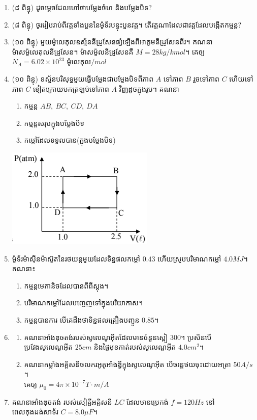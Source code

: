 \documentclass{officialexam}
\begin{document}
\begin{enumerate}[m]
	\item (៨ ពិន្ទុ) ដូចម្តេចដែលហៅថាបម្លែងចំហ និងបម្លែងបិទ?
	\item (៨ ពិន្ទុ) ចូររៀបរាប់ពីវគ្គទាំងបួននៃម៉ូទ័របន្ទុះបួនវគ្គ។ តើវគ្គណាដែលជាវគ្គដែលបង្កើតកម្មន្ត?
	\item (១០ ពិន្ទុ) មួយម៉ូលេគុលឧស្ម័ននីដ្រូសែនផ្សំឡើងពីអាតូមនីដ្រូសែនពីរ។ គណនាម៉ាសម៉ូលេគុលនីដ្រូសែន។ ម៉ាសម៉ូលនីដ្រូសែនគឺ $M=28kg/kmol$។ គេឲ្យ $N_A=6.02\times10^{23}$ ម៉ូលេគុល$/mol$
	\item (១០ ពិន្ទុ) ឧស្ម័នបរិសុទ្ធមួយធ្វើបម្លែងជាបម្លែងបិទពីភាព $A$ ទៅភាព $B$ រួចទៅភាព $C$ ហើយទៅភាព $C$ ទៀតក្រោយមកត្រឡប់ទៅភាព $A$ វិញដូចក្នុងរូប។ គណនា
	\begin{multicols}{2}
		\begin{enumerate}[k]
			\item កម្មន្ត $AB,~BC,~CD,~DA$
			\item កម្មន្តសរុបក្នុងបម្លែងបិទ
			\item កម្តៅដែលទទួលបាន(ក្នុងបម្លែងបិទ)
		\end{enumerate}
		\includegraphics[scale=0.6]{image1}
	\end{multicols}
	\item ម៉ូទ័រម៉ាសុីនម៉ាស៊ូតនៃរថយន្តមួយដែលទិន្នផលកម្តៅ $0.43$ ហើយស្រូបបរិមាណកម្តៅ $4.0MJ$។ គណនា៖
	\begin{enumerate}[k]
		\item កម្មន្តមេកានិចដែលបានពីពីស្តុង។
		\item បរិមាណកម្តៅដែលបញ្ចេញទៅក្នុងបរិយាកាស។
		\item កម្មន្តបានការ បើគេដឹងថាទិន្នផលគ្រឿងបញ្ចូន $0.85$។
	\end{enumerate}
	\item \begin{enumerate}[k]
		\item គណនាអាំងឌុចតង់របស់សូលេណូអុីតដែលមានចំនួនស្ពៀ $300$។ ប្រសិនបើប្រវែងសូលេណូអុីត $25cm$ និងផ្ទៃមុខកាត់របស់សូលេណូអុីត $4.0cm^2$។
		\item គណនាកម្លាំងអគ្គិសនីចលករអូតូអាំងឌ្វីក្នុងសូលេណូអុីត បើចរន្តថយចុះដោយអត្រា $50A/s$។\\ គេឲ្យ $\mu_0=4\pi\times10^{-7}T\cdot m/A$
	\end{enumerate}
	\item គណនាអាំងឌុចតង់ របស់សៀគ្វីអគ្គិសនី $LC$ ដែលមានប្រេកង់ $f=120Hz$ នៅពេលកុងដង់សាទ័រ $C=8.0\mu F$។
\end{enumerate}\newpage
\end{document}
